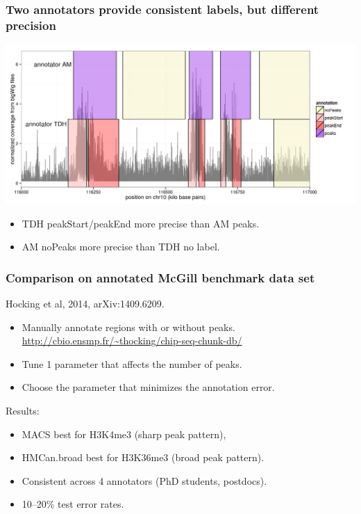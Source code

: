 \documentclass{beamer}
\begin{document}
\begin{frame}
  \frametitle{Two annotators provide consistent labels, but different
    precision}
  \includegraphics[width=1.1\textwidth]{figure-several-annotators}

  \begin{itemize}
  \item TDH peakStart/peakEnd more precise than AM peaks.
  \item AM noPeaks more precise than TDH no label.
  \end{itemize}
\end{frame}

\begin{frame}
  \frametitle{Comparison on annotated McGill benchmark data set}
  Hocking et al, 2014, arXiv:1409.6209.\\
  \begin{itemize}
  \item Manually annotate regions with or without peaks.\\
    \url{http://cbio.ensmp.fr/~thocking/chip-seq-chunk-db/}
  \item Tune 1 parameter that affects the number of peaks.
  \item Choose the parameter that minimizes the annotation error.
  \end{itemize}
  Results:
  \begin{itemize}
  \item MACS best for H3K4me3 (sharp peak pattern),
  \item HMCan.broad best for H3K36me3 (broad peak pattern).
  \item Consistent across 4 annotators (PhD students, postdocs).
  \item 10--20\% test error rates.
  \end{itemize}
\end{frame}
\end{document}
